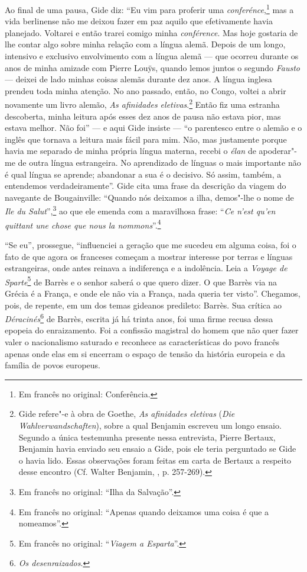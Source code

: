 Ao final de uma pausa, Gide diz: ``Eu vim para proferir uma
\emph{conferénce},\footnote{Em francês no original: Conferência. \versal{[N. T.]}} mas a vida
berlinense não me deixou fazer em paz aquilo que efetivamente havia
planejado. Voltarei e então trarei comigo minha \emph{conférence}. Mas
hoje gostaria de lhe contar algo sobre minha relação com a língua alemã.
Depois de um longo, intensivo e exclusivo envolvimento com a língua
alemã --- que ocorreu durante os anos de minha amizade com Pierre Louÿs,
quando lemos juntos o segundo \emph{Fausto} --- deixei de lado minhas
coisas alemãs durante dez anos. A língua inglesa prendeu toda minha
atenção. No ano passado, então, no Congo, voltei a abrir novamente um
livro alemão, \emph{As afinidades eletivas}.\footnote{Gide
  refere"-e à obra de Goethe, \emph{As afinidades eletivas} (\emph{Die
  Wahlverwandschaften}), sobre a qual Benjamin escreveu um longo ensaio.
  Segundo a única testemunha presente nessa entrevista, Pierre Bertaux,
  Benjamin havia enviado seu ensaio a Gide, pois ele teria perguntado se
  Gide o havia lido. Essas observações foram feitas em carta de Bertaux
  a respeito desse encontro (Cf. Walter Benjamin, ,
  p. 257-269). \versal{[N. T.]}} Então fiz uma estranha descoberta, minha leitura após esses
dez anos de pausa não estava pior, mas estava melhor. Não foi'' --- e aqui
Gide insiste --- ``o parentesco entre o alemão e o inglês que tornava a
leitura mais fácil para mim. Não, mas justamente porque havia me
separado de minha própria língua materna, recebi o \emph{élan} de
apoderar"-me de outra língua estrangeira. No aprendizado de línguas o
mais importante não é qual língua se aprende; abandonar a sua é o
decisivo. Só assim, também, a entendemos verdadeiramente''. Gide cita
uma frase da descrição da viagem do navegante de Bougainville: ``Quando
nós deixamos a ilha, demos"-lhe o nome de \emph{Ile du Salut}'',\footnote{Em francês no original: ``Ilha da Salvação''. \versal{[N. T.]}} ao que ele emenda com a maravilhosa
frase: ``\emph{Ce n'est qu'en quittant une chose que nous la
nommons}''.\footnote{Em francês no original: ``Apenas quando deixamos uma coisa é que a
  nomeamos''. \versal{[N. T.]}}

``Se eu'', prossegue, ``influenciei a geração que me sucedeu em alguma
coisa, foi o fato de que agora os franceses começam a mostrar interesse
por terras e línguas estrangeiras, onde antes reinava a indiferença e a
indolência. Leia a \emph{Voyage de Sparte}\footnote{Em francês no original: ``\emph{Viagem
  a Esparta}''. \versal{[N. T.]}} de Barrès e o senhor saberá o que quero dizer. O que
Barrès via na Grécia é a França, e onde ele não via a França, nada
queria ter visto''. Chegamos, pois, de repente, em um dos temas gideanos
predileto: Barrès. Sua crítica ao \emph{Déracinés}\footnote{\emph{Os desenraizados}. \versal{[N. T.]}} de Barrès, escrita já há trinta anos, foi uma firme recusa dessa
epopeia do enraizamento. Foi a confissão magistral do homem que não quer
fazer valer o nacionalismo saturado e reconhece as características do
povo francês apenas onde elas em si encerram o espaço de tensão da
história europeia e da família de povos europeus.


